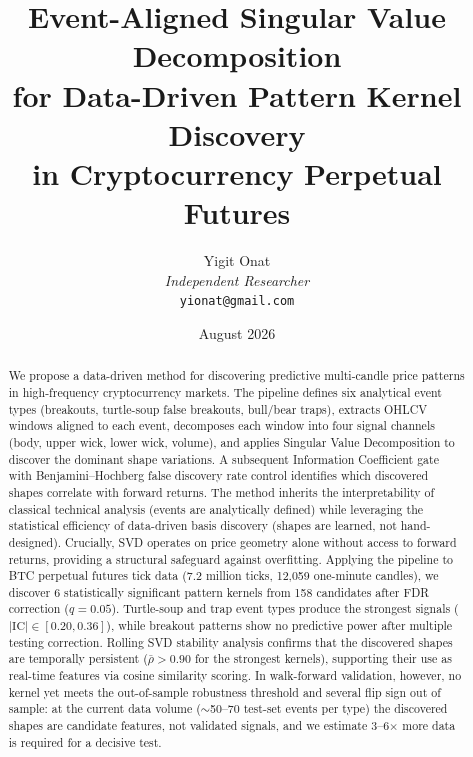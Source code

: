 \documentclass[11pt,a4paper]{article}
\theoremstyle{definition}
\theoremstyle{plain}
\begin{document}
\title{\textbf{Event-Aligned Singular Value Decomposition\\[4pt]
for Data-Driven Pattern Kernel Discovery\\[4pt]
in Cryptocurrency Perpetual Futures}}

\author{Yigit Onat\\
\textit{Independent Researcher}\\
\texttt{yionat@gmail.com}}
\date{August 2026}
\maketitle


\begin{abstract}
We propose a data-driven method for discovering predictive multi-candle
price patterns in high-frequency cryptocurrency markets. The pipeline
defines six analytical event types (breakouts, turtle-soup false breakouts,
bull/bear traps), extracts OHLCV windows aligned to each event, decomposes
each window into four signal channels (body, upper wick, lower wick,
volume), and applies Singular Value Decomposition to discover the dominant
shape variations. A subsequent Information Coefficient gate with
Benjamini--Hochberg false discovery rate control identifies which discovered
shapes correlate with forward returns. The method inherits the
interpretability of classical technical analysis (events are analytically
defined) while leveraging the statistical efficiency of data-driven basis
discovery (shapes are learned, not hand-designed). Crucially, SVD operates
on price geometry alone without access to forward returns, providing a
structural safeguard against overfitting. Applying the pipeline to BTC
perpetual futures tick data (7.2 million ticks, 12{,}059 one-minute
candles), we discover 6 statistically significant pattern kernels from 158
candidates after FDR correction ($q = 0.05$). Turtle-soup and trap event
types produce the strongest signals ($|\text{IC}| \in [0.20, 0.36]$), while
breakout patterns show no predictive power after multiple testing
correction. Rolling SVD stability analysis confirms that the discovered
shapes are temporally persistent ($\bar{\rho} > 0.90$ for the strongest
kernels), supporting their use as real-time features via cosine similarity
scoring. In walk-forward validation, however, no kernel yet meets the
out-of-sample robustness threshold and several flip sign out of sample:
at the current data volume ($\sim$50--70 test-set events per type) the
discovered shapes are candidate features, not validated signals, and we
estimate 3--6$\times$ more data is required for a decisive test.
\end{abstract}
\end{document}

